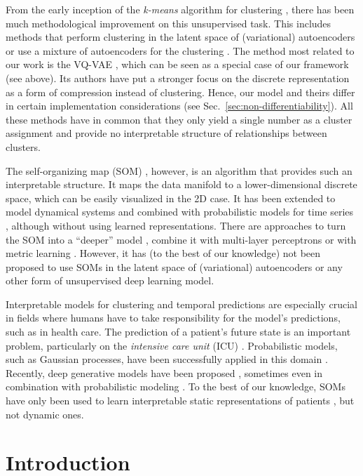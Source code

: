 From the early inception of the \emph{k-means} algorithm for clustering \citep{Lloyd1982}, there has been much methodological improvement on this unsupervised task.
This includes methods that perform clustering in the latent space of (variational) autoencoders \citep{Aljalbout2018} or use a mixture of autoencoders for the clustering \citep{Zhang2017a, Locatello2018}.
The method most related to our work is the VQ-VAE \citep{Oord2017}, which can be seen as a special case of our framework (see above).
Its authors have put a stronger focus on the discrete representation as a form of compression instead of clustering.
Hence, our model and theirs differ in certain implementation considerations (see Sec.\ \ref{sec:non-differentiability}).
All these methods have in common that they only yield a single number as a cluster assignment and provide no interpretable structure of relationships between clusters.

The self-organizing map (SOM) \citep{Kohonen1998}, however, is an algorithm that provides such an interpretable structure.
It maps the data manifold to a lower-dimensional discrete space, which can be easily visualized in the 2D case.
It has been extended to model dynamical systems \citep{Barreto2004} and combined with probabilistic models for time series \citep{Sang2008}, although without using learned representations.
There are approaches to turn the SOM into a ``deeper'' model \citep{Dittenbach2000}, combine it with multi-layer perceptrons \citep{Furukawa2005} or with metric learning \citep{Ponski2014}.
However, it has (to the best of our knowledge) not been proposed to use SOMs in the latent space of (variational) autoencoders or any other form of unsupervised deep learning model.

Interpretable models for clustering and temporal predictions are especially crucial in fields where humans have to take responsibility for the model's predictions, such as in health care.
The prediction of a patient's future state is an important problem, particularly on the \emph{intensive care unit} (ICU) \citep{Harutyunyan2017, Badawi2018}.
Probabilistic models, such as Gaussian processes, have been successfully applied in this domain \citep{Colopy2016, Schulam2016}.
Recently, deep generative models have been proposed \citep{Hyland2017}, sometimes even in combination with probabilistic modeling \citep{Lim2018}.
To the best of our knowledge, SOMs have only been used to learn interpretable static representations of patients \citep{Tirunagari2015}, but not dynamic ones.
\section{Introduction}



